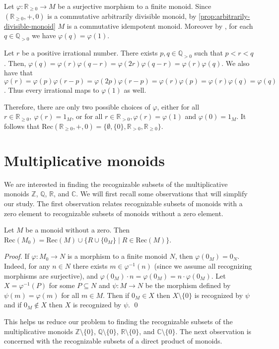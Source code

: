 \documentclass{llncs}
\begin{document}
Let $\varphi: \mathbb{R}_{\geq 0} \to M$ be a surjective morphism to a finite monoid. Since $(\mathbb{R}_{\geq 0}, +, 0)$ is a commutative arbitrarily divisible monoid, by \ref{prop:arbitrarily-divisible-monoid} $M$ is a commutative idempotent monoid. Moreover by , for each $q \in \mathbb{Q}_{> 0}$ we have $\varphi(q) = \varphi(1)$.

 Let $r$ be a positive irrational number. There exists $p, q \in \mathbb{Q}_{> 0}$ such that $p < r < q$. Then, $ \varphi(q) = \varphi(r) \varphi(q-r) = \varphi(2r) \varphi(q- r) = \varphi(r) \varphi(q) $. We also have that $ \varphi(r) = \varphi(p)\varphi(r-p) = \varphi(2p) \varphi(r-p) = \varphi(r)\varphi(p) = \varphi(r) \varphi(q) = \varphi(q)$. Thus every irrational maps to $\varphi(1)$ as well.

Therefore, there are only two possible choices of $\varphi$, either for all $r \in \mathbb{R}_{\geq 0},\ \varphi(r) = 1_M$, or for all $r \in \mathbb{R}_{>0}, \varphi(r) = \varphi(1)$ and $\varphi(0) = 1_M$. It follows that $\text{Rec}(\mathbb{R}_{\geq 0}, +, 0) = \{\emptyset, \{0\},  \mathbb{R}_{> 0}, \mathbb{R}_{\geq 0}\}$.

\section{Multiplicative monoids} \label{sec:multiplicative-monoids}

We are interested in finding the recognizable subsets of the multiplicative monoids \(\mathbb{Z}\), \(\mathbb{Q}\), \(\mathbb{R}\), and \(\mathbb{C}\).
We will first recall some observations that will simplify our study.
The first observation relates recognizable subsets of monoids with a zero element to recognizable subsets of monoids without a zero element.

\begin{proposition}
  Let $M$ be a monoid without a zero. Then $\text{Rec}(M_0)= \text{Rec}(M) \cup \{R \cup \{0_M\} \mid R \in \text{Rec}(M)\}$.
  \label{prop:monoids-with-zero-rec}
\end{proposition}
\begin{proof} 
  If $\varphi: M_0 \to N$ is a morphism to a finite monoid $N$, then $\varphi(0_M) = 0_N$. Indeed, for any $n \in N$ there exists $m \in \varphi^{-1}(n)$ (since we assume all recognizing morphisms are surjective), and $\varphi(0_M) \cdot n = \varphi(0_M) = n \cdot \varphi(0_M)$. Let $X = \varphi^{-1}(P)$ for some $P \subseteq N$ and $\psi:M \to N$ be the morphism defined by $\psi(m) = \varphi(m)$ for all $m \in M$. Then if $0_M \in X$ then $X \setminus \{0\}$ is recognized by $\psi$ and if $0_M \notin X$ then $X$ is recognized by $\psi$.
  \qed
\end{proof}
This helps us reduce our problem to finding the recognizable subsets of the multiplicative monoids 
\(\mathbb{Z} \setminus \{0\}\),
\(\mathbb{Q} \setminus \{0\}\),
\(\mathbb{R} \setminus \{0\}\), and
\(\mathbb{C} \setminus \{0\}\).
The next observation is concerned with the recognizable subsets of a direct product of monoids.
\end{document}
